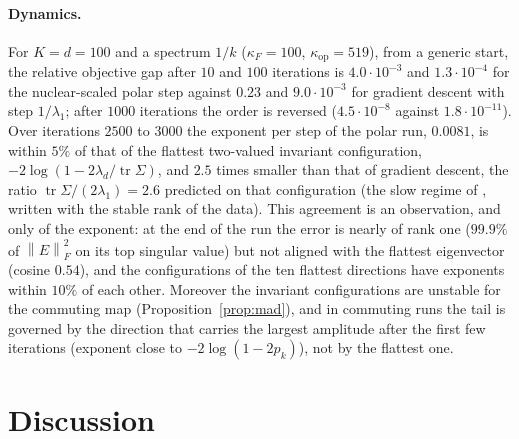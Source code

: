 \documentclass[11pt]{article}
\theoremstyle{remark}
\newcommand{\nF}[1]{\left\|#1\right\|_{F}}
\newcommand{\tr}{\operatorname{tr}}
\newcommand{\kop}{\kappa_{\mathrm{op}}}
\newcommand{\kF}{\kappa_{F}}
\begin{document}
\paragraph{Dynamics.} For $K=d=100$ and a spectrum $1/k$ ($\kF=100$, $\kop=519$), from a generic start, the relative
objective gap after $10$ and $100$ iterations is $4.0\cdot10^{-3}$ and $1.3\cdot10^{-4}$ for the nuclear-scaled polar step
against $0.23$ and $9.0\cdot10^{-3}$ for gradient descent with step $1/\lambda_1$; after $1000$ iterations the order is
reversed ($4.5\cdot10^{-8}$ against $1.8\cdot10^{-11}$). Over iterations $2500$ to $3000$ the exponent per step of the
polar run, $0.0081$, is within $5\%$ of that of the flattest two-valued invariant configuration,
$-2\log(1-2\lambda_d/\tr\Sigma)$, and $2.5$ times smaller than that of gradient descent, the ratio
$\tr\Sigma/(2\lambda_1)=2.6$ predicted on that configuration (the slow regime of \cite{shulgin2026quadratic}, written
with the stable rank of the data). This agreement is an observation, and only of the exponent: at the end of the run
the error is nearly of rank one ($99.9\%$ of $\nF E^2$ on its top singular value) but not aligned with the flattest
eigenvector (cosine $0.54$), and the configurations of the ten flattest directions have exponents within $10\%$ of
each other. Moreover the invariant configurations are unstable for the commuting map (Proposition~\ref{prop:mad}), and
in commuting runs the tail is governed by the direction that carries the largest amplitude after the first few
iterations (exponent close to $-2\log(1-2p_k)$), not by the flattest one.

\section{Discussion}\label{sec:discussion}
\end{document}
